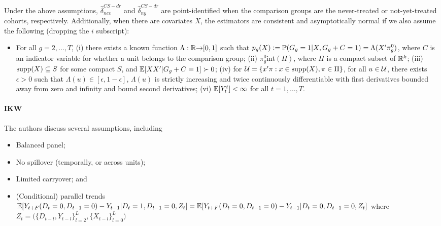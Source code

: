 \documentclass[12pt]{article}
\begin{document}
Under the above assumptions, $\hat\delta^{CS-dr}_{nev}$ and $\hat\delta^{CS-dr}_{ny}$ are point-identified when the comparison groups are the never-treated or not-yet-treated cohorts, respectively. Additionally, when there are covariates $X$, the estimators are consistent and asymptotically normal if we also assume the following (dropping the $i$ subscript):
\begin{itemize}
     \item For all $g=2,\dots, T$, (i) there exists a known function $\Lambda:\mathbb{R}{\rightarrow}[0,1]$ such that $p_g(X)\vcentcolon=\mathbb{P}(G_g=1 | X, G_g+C = 1)=\Lambda(X'\pi_g^0)$, where $C$ is an indicator variable for whether a unit belongs to the comparison group; (ii) $\pi_g^0$int$(\Pi)$, where $\Pi$ is a compact subset of $\mathbb{R}^k$; (iii) $\mathop{\rm supp}(X)\subseteq S$ for some compact $S$, and $\mathbb{E}[XX'|G_g+C=1]\succ0$; (iv) for $\mathcal{U}=\{x'\pi:x\in\mathop{\rm supp}(X), \pi\in\Pi\}$, for all $u\in \mathcal{U}$, there exists $\epsilon>0$ such that $\Lambda(u)\in[\epsilon, 1-\epsilon]$, $\Lambda(u)$ is strictly increasing and twice continuously differentiable with first derivatives bounded away from zero and infinity and bound second derivatives; (vi) $\mathbb{E}[Y_t^t] < \infty$ for all $t=1,\dots, T$.
\end{itemize}




\paragraph*{IKW \citeyearpar{IKW2021}}
The authors discuss several assumptions, including
\begin{itemize}
     \item Balanced panel;
     \item No spillover (temporally, or across units);
     \item Limited carryover; and
     \item (Conditional) parallel trends
$\mathbb{E}[Y_{t+F}(D_t=0, D_{t-1}=0) - Y_{t-1} | D_t=1, D_{t-1}=0, Z_t] = \mathbb{E}[Y_{t+F}(D_t=0, D_{t-1}=0) - Y_{t-1} | D_t=0, D_{t-1}=0, Z_t] $
where $Z_t=\big(\{D_{t-l}, Y_{t-l}\}_{l=2}^L, \{X_{t-l}\}_{l=0}^L\big)$
\end{itemize}
\end{document}
